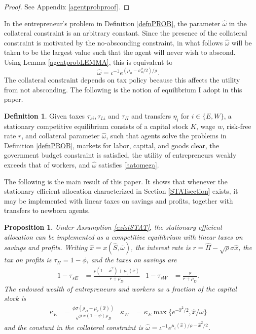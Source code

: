 \documentclass[11pt]{article}
\theoremstyle{plain}
\newtheorem{prop}[thm]{Proposition}
\theoremstyle{definition} %
\newtheorem{defn}{Definition}[section]
\begin{document}
\begin{proof}
See Appendix \ref{agentprobproof}. 
\end{proof}

In the entrepreneur's problem in Definition \ref{defnPROB}, the parameter $\hat{\omega}$ in the collateral constraint is an arbitrary constant. Since the presence of the collateral constraint is motivated by the no-absconding constraint, in what follows $\hat{\omega}$ will be taken to be the largest value such that the agent will never wish to abscond. Using Lemma \ref{agentprobLEMMA}, this is equivalent to
\begin{equation}
\hat{\omega} = \iota^{-1}e^{{\left(\mu_a - \sigma_a^2/2\right)}/\rho}. 
\label{hatomega}
\end{equation}
The collateral constraint depends on tax policy because this affects the utility from not absconding. The following is the notion of equilibrium I adopt in this paper. 

\begin{defn}
Given taxes $\tau_{si}, \tau_{Li}$ and $\tau_{\Pi}$ and transfers $\eta_i$ for $i \in \{E,W\}$, a stationary competitive equilibrium consists of a capital stock $K$, wage $w$, risk-free rate $r$, and collateral parameter $\hat{\omega}$, such that agents solve the problems in Definition \ref{defnPROB}, markets for labor, capital, and goods clear, the government budget constraint is satisfied, the utility of entrepreneurs weakly exceeds that of workers, and $\hat{\omega}$ satisfies \eqref{hatomega}. 
\end{defn}

The following is the main result of this paper. It shows that whenever the stationary efficient allocation characterized in Section \ref{STATsection} exists, it may be implemented with linear taxes on savings and profits, together with transfers to newborn agents. 

\begin{prop} \label{zerodriftEQ}
Under Assumption \ref{existSTAT}, the stationary efficient allocation can be implemented as a competitive equilibrium with linear taxes on savings and profits. Writing $\hat{x} = x(\hat{S}, \overline{\omega})$, the interest rate is $r = \hat{\Pi} - \sqrt{\rho} \sigma \hat{x}$, the tax on profits is $\tau_{\Pi} = 1 - \phi$, and the taxes on savings are %
\begin{align*}
1-\tau_{sE} & = \frac{\rho(1 - \hat{x}^2) + \mu_c(\hat{x})}{r + \rho_D} &
1-\tau_{sW} & = \frac{\rho}{r + \rho_D}.
\end{align*}
The endowed wealth of entrepreneurs and workers as a fraction of the capital stock is
\begin{align*}
\kappa_E & = \frac{\phi \sigma(\rho_D - \mu_c(\hat{x}))}{\sqrt{\rho} \hat{x}(1-\psi)\rho_D} &
\kappa_W & = \kappa_E\max\{e^{-\hat{x}^2/2}, \hat{x}/\overline{\omega}\}
\end{align*}
and the constant in the collateral constraint is $\hat{\omega} = \iota^{-1}e^{\mu_c(\hat{x})/\rho - \hat{x}^2/2}$. 
\end{prop}
\end{document}
